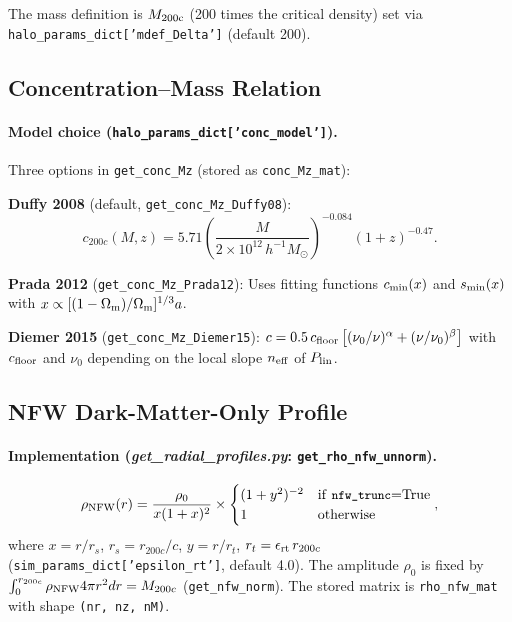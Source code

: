\documentclass[12pt,a4paper]{article}
\newcommand{\code}[1]{\texttt{\small #1}}
\newcommand{\param}[1]{\texttt{\small #1}}
\newcommand{\file}[1]{\textit{\small #1}}
\begin{document}
The mass definition is $M_{\rm 200c}$ (200 times the critical density) set via
\param{halo\_params\_dict['mdef\_Delta']} (default 200).

\subsection{Concentration--Mass Relation}
\label{sec:conc}

\paragraph{Model choice (\param{halo\_params\_dict['conc\_model']}).}
Three options in \code{get\_conc\_Mz} (stored as \code{conc\_Mz\_mat}):

\textbf{Duffy 2008} \citep{Duffy2008} (default, \code{get\_conc\_Mz\_Duffy08}):
\begin{equation}
  c_{200c}(M,z) = 5.71\left(\frac{M}{2\times10^{12}\,h^{-1}M_\odot}\right)^{-0.084}
  (1+z)^{-0.47}.
\end{equation}

\textbf{Prada 2012} \citep{Prada2012} (\code{get\_conc\_Mz\_Prada12}):
Uses fitting functions $c_{\rm min}(x)$ and $s_{\rm min}(x)$ with
$x\propto[(1-\Omega_{\rm m})/\Omega_{\rm m}]^{1/3}a$.

\textbf{Diemer 2015} \citep{Diemer2015} (\code{get\_conc\_Mz\_Diemer15}):
$c = 0.5\,c_{\rm floor}\left[(\nu_0/\nu)^\alpha + (\nu/\nu_0)^\beta\right]$
with $c_{\rm floor}$ and $\nu_0$ depending on the local slope $n_{\rm eff}$ of
$P_{\rm lin}$.

\subsection{NFW Dark-Matter-Only Profile}
\label{sec:nfw}

\paragraph{Implementation (\file{get\_radial\_profiles.py}: \code{get\_rho\_nfw\_unnorm}).}
\begin{equation}
  \rho_{\rm NFW}(r) = \frac{\rho_0}{x(1+x)^2}
  \times
  \begin{cases}
    (1+y^2)^{-2} & \text{if \param{nfw\_trunc}=True} \\
    1            & \text{otherwise}
  \end{cases},
\end{equation}
where $x=r/r_s$, $r_s=r_{200c}/c$, $y=r/r_t$, $r_t = \epsilon_{\rm rt}\,r_{200c}$
(\param{sim\_params\_dict['epsilon\_rt']}, default 4.0).
The amplitude $\rho_0$ is fixed by $\int_0^{r_{200c}}\rho_{\rm NFW}4\pi r^2 dr = M_{200c}$
(\code{get\_nfw\_norm}). The stored matrix is \code{rho\_nfw\_mat} with shape
\code{(nr, nz, nM)}.
\end{document}
